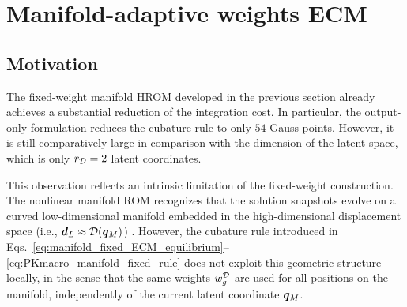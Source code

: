 \documentclass[11pt,a4paper]{article}
\newcommand{\PROMPT}[1]{ }
\begin{document}
\section{Manifold-adaptive weights ECM}
\label{sec:MAW_ECM}

\PROMPT{}



%

\subsection{Motivation}
\label{sec:motivation_MAW_ECM}
The fixed-weight manifold HROM developed in the previous section already
achieves a substantial reduction of the integration cost. In particular, the
output-only formulation reduces the cubature rule to only \(54\) Gauss points. However, it is still comparatively large in comparison with the dimension of the latent space, which is only
\(r_{\mathcal{D}}=2\) latent coordinates.

This observation reflects an intrinsic limitation of the fixed-weight
construction. The nonlinear manifold ROM recognizes that
the solution snapshots evolve on a curved low-dimensional manifold embedded in
the high-dimensional displacement space (i.e., $\bm{d}_L \approx \mathcal{\boldsymbol{D}}(\bm{q}_M)$) . However, the cubature rule introduced
in Eqs.~\eqref{eq:manifold_fixed_ECM_equilibrium}--%
\eqref{eq:PKmacro_manifold_fixed_rule} does not exploit this geometric
structure locally, in the sense  that the same weights
\(w^{\mathcal{D}}_{g}\) are used for all positions on the manifold, independently of the
current latent coordinate \(\bm{q}_M\).
\end{document}
